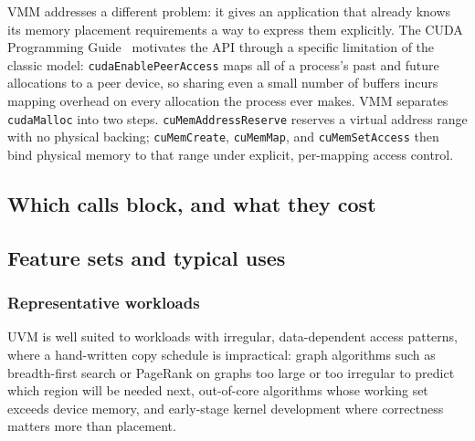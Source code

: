 VMM addresses a different problem: it gives an application that already
knows its memory placement requirements a way to express them explicitly.
The CUDA Programming Guide~\citep{cuda_programming_guide} motivates the API through a specific limitation
of the classic model: \texttt{cudaEnablePeerAccess} maps all of a process's
past and future allocations to a peer device, so sharing even a small number
of buffers incurs mapping overhead on every allocation the process ever
makes. VMM separates \texttt{cudaMalloc} into two steps.
\texttt{cuMemAddressReserve} reserves a virtual address range with no
physical backing; \texttt{cuMemCreate}, \texttt{cuMemMap}, and
\texttt{cuMemSetAccess} then bind physical memory to that range under
explicit, per-mapping access control.


\subsection{Which calls block, and what they cost}
\label{sec:bg-sync}


\subsection{Feature sets and typical uses}
\label{sec:bg-features}

\subsubsection{Representative workloads}


UVM is well suited to workloads with irregular, data-dependent access
patterns, where a hand-written copy schedule is impractical: graph
algorithms such as breadth-first search or PageRank on graphs too large or
too irregular to predict which region will be needed next, out-of-core
algorithms whose working set exceeds device memory, and early-stage kernel
development where correctness matters more than placement.


